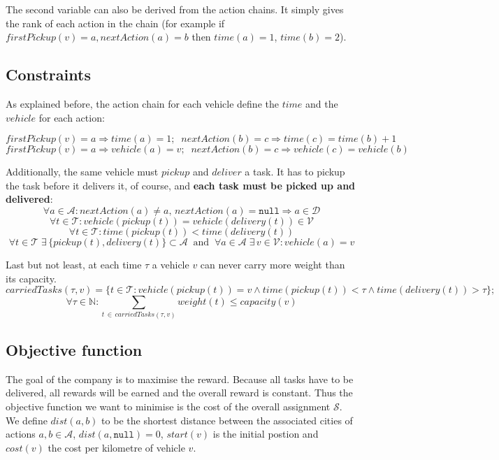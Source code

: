 \documentclass[11pt]{article}
\begin{document}
The second variable can also be 
derived from the action chains. It simply gives the rank of each action
in the chain (for example if 
$firstPickup(v) = a, nextAction(a) = b$ then $time(a) = 1$, $time(b) = 2$).

\subsection{Constraints}
As explained before, the action chain for each vehicle define the $time$ 
and the $vehicle$ for each action:

$$
firstPickup(v) = a \Rightarrow time(a) = 1; \;\;
nextAction(b) = c \Rightarrow time(c) = time(b) + 1
$$
$$
firstPickup(v) = a \Rightarrow vehicle(a) = v; \;\;
nextAction(b) = c \Rightarrow vehicle(c) = vehicle(b)
$$

Additionally, the same vehicle must $pickup$ and $deliver$ a task. 
It has to pickup the task before it delivers it, of course, 
and \textbf{each task must be picked up and delivered}:
$$
\forall a \in \mathcal{A}  :
nextAction(a) \neq a, \,
nextAction(a) = \mathtt{null} \Rightarrow a \in \mathcal{D}
$$
$$
\forall t \in \mathcal{T}: 
vehicle(pickup(t)) = vehicle(delivery(t)) \in \mathcal{V}
$$
$$
\forall t \in \mathcal{T}: 
time(pickup(t)) < time(delivery(t))
$$
$$
\forall t \in \mathcal{T} \; 
\exists  \, \{ pickup(t), delivery(t) \} \subset \mathcal{A} \;\;
\text{and} \;\;
\forall a \in \mathcal{A} \;
\exists \, v \in \mathcal{V} : 
vehicle(a) = v
$$

Last but not least, at each time $\tau$ a vehicle $v$ can never 
carry more weight than its capacity.
$$
carriedTasks(\tau, v) = \{t \in \mathcal{T}: 
vehicle(pickup(t)) = v \wedge 
time(pickup(t)) < \tau \wedge 
time(delivery(t)) > \tau \};
$$
$$
\forall \tau \in \mathbb{N}:
\sum_{t \, \in \, carriedTasks(\tau, v)} weight(t) \leq
capacity(v)
$$



\subsection{Objective function} 

The goal of the company is to maximise the reward. Because all tasks have to be
delivered, all rewards will be earned and the overall reward is constant. Thus
the objective function we want to minimise is the cost of the overall assignment
$\mathcal{S}$. We define $dist(a,b)$ to be the shortest distance between the
associated cities of actions $a,b \in \mathcal{A}$, $dist(a, \mathtt{null}) =
0$, $start(v)$ is the initial postion and $cost(v)$ the cost per kilometre of
vehicle $v$.
\end{document}
